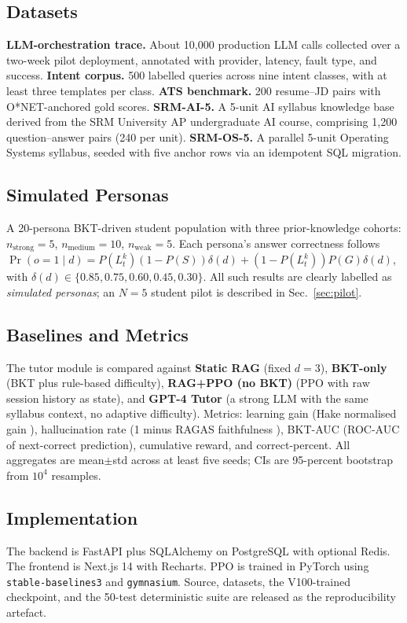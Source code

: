 \documentclass[conference]{IEEEtran}
\begin{document}
\subsection{Datasets}
\textbf{LLM-orchestration trace.} About 10{,}000 production LLM calls
collected over a two-week pilot deployment, annotated with provider,
latency, fault type, and success.
\textbf{Intent corpus.} 500 labelled queries across nine intent
classes, with at least three templates per class.
\textbf{ATS benchmark.} 200 resume--JD pairs with O*NET-anchored gold
scores.
\textbf{SRM-AI-5.} A 5-unit AI syllabus knowledge base derived from
the SRM University AP undergraduate AI course, comprising 1{,}200
question--answer pairs (240 per unit).
\textbf{SRM-OS-5.} A parallel 5-unit Operating Systems syllabus,
seeded with five anchor rows via an idempotent SQL migration.

\subsection{Simulated Personas}
A 20-persona BKT-driven student population with three prior-knowledge
cohorts: $n_{\text{strong}}=5$, $n_{\text{medium}}=10$,
$n_{\text{weak}}=5$. Each persona's answer correctness follows
$\Pr(o{=}1\mid d) = P(L^k_t)(1{-}P(S))\delta(d) +
(1{-}P(L^k_t))P(G)\delta(d)$, with
$\delta(d)\in\{0.85,0.75,0.60,0.45,0.30\}$. All such results are
clearly labelled as \emph{simulated personas}; an $N{=}5$ student
pilot is described in Sec.~\ref{sec:pilot}.

\subsection{Baselines and Metrics}
The tutor module is compared against \textbf{Static RAG} (fixed
$d=3$), \textbf{BKT-only} (BKT plus rule-based difficulty),
\textbf{RAG+PPO (no BKT)} (PPO with raw session history as state),
and \textbf{GPT-4 Tutor} (a strong LLM with the same syllabus
context, no adaptive difficulty). Metrics: learning gain (Hake
normalised gain \cite{hake1998}), hallucination rate (1 minus RAGAS
faithfulness \cite{ragas2023}), BKT-AUC (ROC-AUC of next-correct
prediction), cumulative reward, and correct-percent. All aggregates
are mean$\pm$std across at least five seeds; CIs are 95-percent
bootstrap from $10^4$ resamples.

\subsection{Implementation}
The backend is FastAPI plus SQLAlchemy on PostgreSQL with optional
Redis. The frontend is Next.js 14 with Recharts. PPO is trained in
PyTorch using \texttt{stable-baselines3} and \texttt{gymnasium}.
Source, datasets, the V100-trained checkpoint, and the 50-test
deterministic suite are released as the reproducibility artefact.
\end{document}
